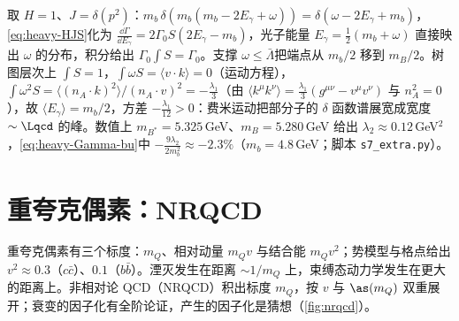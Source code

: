 \begin{example}[端点区的树图检验]\label{ex:heavy-photon}
取 $H=1$、$J=\delta(p^2)$：$m_b\,\delta(m_b(m_b-2E_\gamma+\omega))=\delta(\omega-2E_\gamma+m_b)$，\cref{eq:heavy-HJS}化为 $\frac{\dd\Gamma}{\dd E_\gamma}=2\Gamma_0S(2E_\gamma-m_b)$，光子能量 $E_\gamma=\frac12(m_b+\omega)$ 直接映出 $\omega$ 的分布，积分给出 $\Gamma_0\int S=\Gamma_0$。支撑 $\omega\le\bar\Lambda$\cite{Neubert1994b}把端点从 $m_b/2$ 移到 $m_B/2$。树图层次上 $\int S=1$，$\int\omega S=\langle v\cdot k\rangle=0$（运动方程），$\int\omega^2S=\langle(n_A\cdot k)^2\rangle/(n_A\cdot v)^2=-\frac{\lambda_1}{3}$（由 $\langle k^\mu k^\nu\rangle=\frac{\lambda_1}{3}(g^{\mu\nu}-v^\mu v^\nu)$ 与 $n_A^2=0$），故 $\langle E_\gamma\rangle=m_b/2$，方差 $-\frac{\lambda_1}{12}>0$：费米运动把部分子的 $\delta$ 函数谱展宽成宽度 $\sim\Lqcd$ 的峰。数值上 $m_{B^*}=5.325$\,GeV、$m_B=5.280$\,GeV 给出 $\lambda_2\approx0.12$\,GeV$^2$，\cref{eq:heavy-Gamma-bu}中 $-\frac{9\lambda_2}{2m_b^2}\approx-2.3\%$（$m_b=4.8$\,GeV；脚本 \texttt{s7\_\allowbreak extra.py}）。
\end{example}

\section{重夸克偶素：NRQCD}\label{sec:heavy-nrqcd}

重夸克偶素有三个标度：$m_Q$、相对动量 $m_Qv$ 与结合能 $m_Qv^2$；势模型与格点给出 $v^2\approx0.3$（$c\bar c$）、$0.1$（$b\bar b$）\cite[第~II.A~节]{BodwinBraatenLepage1995}。湮灭发生在距离 $\sim1/m_Q$ 上，束缚态动力学发生在更大的距离上。非相对论 QCD（NRQCD）积出标度 $m_Q$，按 $v$ 与 $\as(m_Q)$ 双重展开\cite{CaswellLepage1986,BodwinBraatenLepage1995}；衰变的因子化有全阶论证，产生的因子化是猜想（\cref{fig:nrqcd}）。

